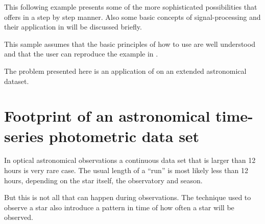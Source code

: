 
This following example presents some of the more sophisticated possibilities 
that \period offers in a step by step manner.
Also some basic concepts of signal-processing and their 
application in \period will be discussed briefly.

This sample assumes that the basic principles of how to
use \period are well understood and that the user can
reproduce the example in
.

The problem presented here is an application
of \period on an extended astronomical dataset.


\section{Footprint of an astronomical time-series photometric data set}

In optical astronomical observations a continuous data set 
that is larger than 12 hours is very rare case.
The usual length of a ``run'' is most likely less than 12 hours,
depending on the star itself, the observatory and
season.

But this is not all that can happen during observations.
The technique used to observe a star also introduce
a pattern in time of how often a star will be observed.

